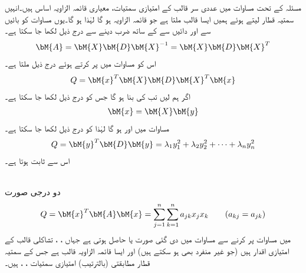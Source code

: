 مسئلہ  کے تحت مساوات  میں  عددی سر قالب  کے امتیازی سمتیات، معیاری قائمہ الزاویہ اساس ہیں۔انہیں سمتیہ قطار لیتے ہوئے ہمیں ایسا قالب  ملتا ہے جو قائمہ الزاویہ ہو گا لہٰذا  ہو گا۔یوں مساوات  کو بائیں سے  اور دائیں سے  کے ساتھ ضرب دینے سے درج ذیل لکھا جا سکتا ہے۔
\begin{align*}
\bM{A}=\bM{X}\bM{D}\bM{X}^{-1}=\bM{X}\bM{D}\bM{X}^T
\end{align*}
اس کو مساوات  میں پر کرتے ہوئے درج ذیل ملتا ہے۔
\begin{align}\label{مساوات_امتیازی_صدر_وتر_الف}
Q=\bM{x}^T\bM{X}\bM{D}\bM{X}^T\bM{x}
\end{align}
اگر ہم  لیں تب  کی بنا  ہو گا جس کو درج ذیل لکھا جا سکتا ہے۔
\begin{align}\label{مساوات_امتیازی_صدر_وتر_ب}
\bM{x}=\bM{X}\bM{y}
\end{align}  
مساوات  میں  اور  ہو گا لہٰذا  کو درج ذیل لکھا جا سکتا ہے۔
\begin{align}\label{مساوات_امتیازی_صدر_وتر_پ}
Q=\bM{y}^T\bM{D}\bM{y}=\lambda_1y_1^2+\lambda_2y_2^2+\cdots+\lambda_ny_n^2
\end{align}
اس سے    ثابت ہوتا ہے۔

\quad {}\\
دو درجی صورت
\begin{align}\label{مساوات_امتیازی_صدر_وتر_ت}
Q=\bM{x}^T\bM{A}\bM{x}=\sum_{j=1}^{n}\sum_{k=1}^{n}a_{jk}x_jx_k\quad \quad (a_{kj}=a_{jk})
\end{align}
میں مساوات  پر کرنے سے مساوات  میں دی گئی  صورت یا  حاصل ہوتی ہے جہاں ، ،  تشاکلی قالب  کے امتیازی اقدار ہیں (جو غیر منفرد بھی ہو سکتے ہیں) اور  ایسا قائمہ الزاویہ قالب ہے جس کے سمتیہ قطار  مطابقتی (بالترتیب)  امتیازی سمتیات ، ،  ہیں۔

